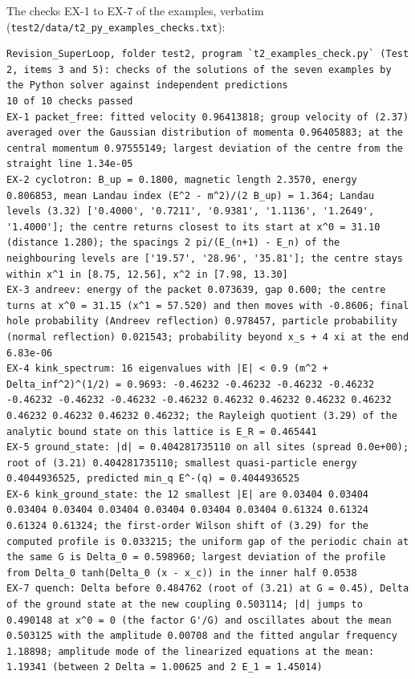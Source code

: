 \documentclass[
  10pt,
]{article}
\begin{document}
The checks EX-1 to EX-7 of the examples, verbatim
(\texttt{test2/data/t2\_py\_examples\_checks.txt}):

\begin{verbatim}
Revision_SuperLoop, folder test2, program `t2_examples_check.py` (Test 2, items 3 and 5): checks of the solutions of the seven examples by the Python solver against independent predictions
10 of 10 checks passed
EX-1 packet_free: fitted velocity 0.96413818; group velocity of (2.37) averaged over the Gaussian distribution of momenta 0.96405883; at the central momentum 0.97555149; largest deviation of the centre from the straight line 1.34e-05
EX-2 cyclotron: B_up = 0.1800, magnetic length 2.3570, energy 0.806853, mean Landau index (E^2 - m^2)/(2 B_up) = 1.364; Landau levels (3.32) ['0.4000', '0.7211', '0.9381', '1.1136', '1.2649', '1.4000']; the centre returns closest to its start at x^0 = 31.10 (distance 1.280); the spacings 2 pi/(E_(n+1) - E_n) of the neighbouring levels are ['19.57', '28.96', '35.81']; the centre stays within x^1 in [8.75, 12.56], x^2 in [7.98, 13.30]
EX-3 andreev: energy of the packet 0.073639, gap 0.600; the centre turns at x^0 = 31.15 (x^1 = 57.520) and then moves with -0.8606; final hole probability (Andreev reflection) 0.978457, particle probability (normal reflection) 0.021543; probability beyond x_s + 4 xi at the end 6.83e-06
EX-4 kink_spectrum: 16 eigenvalues with |E| < 0.9 (m^2 + Delta_inf^2)^(1/2) = 0.9693: -0.46232 -0.46232 -0.46232 -0.46232 -0.46232 -0.46232 -0.46232 -0.46232 0.46232 0.46232 0.46232 0.46232 0.46232 0.46232 0.46232 0.46232; the Rayleigh quotient (3.29) of the analytic bound state on this lattice is E_R = 0.465441
EX-5 ground_state: |d| = 0.404281735110 on all sites (spread 0.0e+00); root of (3.21) 0.404281735110; smallest quasi-particle energy 0.4044936525, predicted min_q E^-(q) = 0.4044936525
EX-6 kink_ground_state: the 12 smallest |E| are 0.03404 0.03404 0.03404 0.03404 0.03404 0.03404 0.03404 0.03404 0.61324 0.61324 0.61324 0.61324; the first-order Wilson shift of (3.29) for the computed profile is 0.033215; the uniform gap of the periodic chain at the same G is Delta_0 = 0.598960; largest deviation of the profile from Delta_0 tanh(Delta_0 (x - x_c)) in the inner half 0.0538
EX-7 quench: Delta before 0.484762 (root of (3.21) at G = 0.45), Delta of the ground state at the new coupling 0.503114; |d| jumps to 0.490148 at x^0 = 0 (the factor G'/G) and oscillates about the mean 0.503125 with the amplitude 0.00708 and the fitted angular frequency 1.18898; amplitude mode of the linearized equations at the mean: 1.19341 (between 2 Delta = 1.00625 and 2 E_1 = 1.45014)

\end{verbatim}
\end{document}

